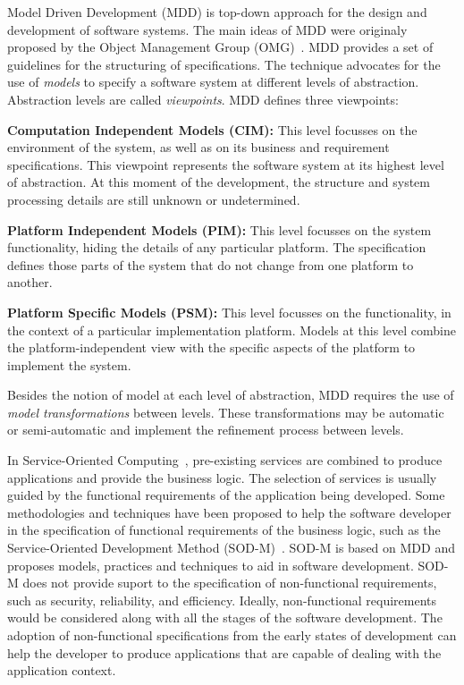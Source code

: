 Model Driven Development (MDD) is top-down approach for the design and development of software systems. 
The main ideas of MDD were originaly proposed by the Object Management Group
(OMG)~\cite{mda}. 
MDD provides a set of
guidelines for the structuring of specifications.
The technique advocates for the use of \textit{models} to specify a software system at different levels of abstraction.
Abstraction levels are called \textit{viewpoints}. 
MDD defines three viewpoints:

\begin{trivlist}
\item \textbf{Computation Independent Models (CIM):} This level focusses on the
environment of the system, as well as on its business and requirement specifications. 
This viewpoint represents the software system at its highest level of abstraction. 
At this moment of the development, the structure and system processing details are still unknown or undetermined. 
 
\item \textbf{Platform Independent Models (PIM):} This level focusses on the system functionality, hiding the details of any particular platform. 
The specification defines those parts of the system that do not change from one platform to another. 

\item \textbf{Platform Specific Models (PSM):} This level focusses on the functionality, in the context of a particular implementation platform.
Models at this level combine the platform-independent view with the specific aspects of the platform to implement the system.  
\end{trivlist}

Besides the notion of model at each level of abstraction, MDD requires the use of \textit{model transformations} between levels.
These transformations may be automatic or semi-automatic and implement the refinement process between levels.

\bigskip 

In Service-Oriented Computing~\cite{Papazoglou2007}, pre-existing services are
combined to produce applications and provide the business logic. The selection of services is usually guided by the functional requirements of the application being developed. 
Some methodologies and techniques have been proposed to help the software
developer in the specification of functional requirements of the business logic,
such as the Service-Oriented Development Method
(SOD-M)~\cite{decastro1}. 
SOD-M is based on MDD and proposes
models, practices and techniques to aid in software development. SOD-M does not
provide suport to the specification of non-functional requirements, such as
security, reliability, and efficiency. Ideally, non-functional requirements
would be considered along with all the stages of the software development. The
adoption of non-functional specifications from the early states of development
can help the developer to produce applications that are capable of dealing with
the application context.

